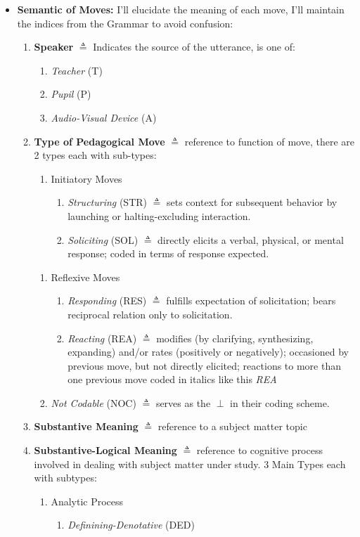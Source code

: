 \documentclass[10pt, letterpaper]{article}
\begin{document}
\begin{itemize}
\item \textbf{Semantic of Moves:}
\label{sec:org8e2aed4}
I'll elucidate the meaning of each move, I'll maintain the indices from the Grammar to avoid confusion:
\begin{enumerate}
\item \textbf{Speaker} \(\triangleq\) Indicates the source of the utterance, is one of:
\begin{enumerate}
\item \emph{Teacher} (T)
\item \emph{Pupil} (P)
\item \emph{Audio-Visual Device} (A)
\end{enumerate}
\item \textbf{Type of Pedagogical Move} \(\triangleq\) reference to function of move, there are 2 types each with sub-types:
\begin{enumerate}
\item Initiatory Moves
\begin{enumerate}
\item \emph{Structuring} (STR) \(\triangleq\) sets context for subsequent behavior by launching or halting-excluding interaction.
\item \emph{Soliciting} (SOL) \(\triangleq\) directly elicits a verbal, physical, or mental response; coded in terms of response expected.
\end{enumerate}
\end{enumerate}
\begin{enumerate}
\item Reflexive Moves
\begin{enumerate}
\item \emph{Responding} (RES) \(\triangleq\) fulfills expectation of solicitation; bears reciprocal relation only to solicitation.
\item \emph{Reacting} (REA) \(\triangleq\) modifies (by clarifying, synthesizing, expanding) and/or rates (positively or negatively); occasioned by previous move, but not directly elicited; reactions to more than one previous move coded in italics like this \emph{REA}
\end{enumerate}
\item \emph{Not Codable} (NOC) \(\triangleq\) serves as the \(\perp\) in their coding scheme.
\end{enumerate}
\item \textbf{Substantive Meaning} \(\triangleq\) reference to a subject matter topic
\item \textbf{Substantive-Logical Meaning} \(\triangleq\) reference to cognitive process involved in dealing with subject matter under study. 3 Main Types each with subtypes:
\begin{enumerate}
\item Analytic Process
\begin{enumerate}
\item \emph{Definining-Denotative} (DED)
\end{enumerate}
\end{enumerate}
\end{enumerate}


\end{itemize}
\end{document}
